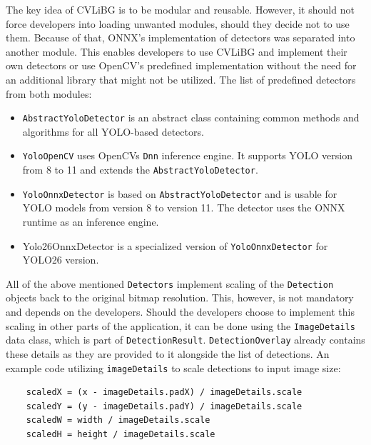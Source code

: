 The key idea of CVLiBG is to be modular and reusable. However, it should not force developers into loading unwanted modules, should they decide not to use them. Because of that, ONNX's implementation of detectors was separated into another module. This enables developers to use CVLiBG and implement their own detectors or use OpenCV's predefined implementation without the need for an additional library that might not be utilized. The list of predefined detectors from both modules:

\begin{itemize}
  \item {\texttt{AbstractYoloDetector} is an abstract class containing common methods and algorithms for all YOLO-based detectors.}
  \item{\texttt{YoloOpenCV} uses OpenCVs \texttt{Dnn} inference engine. It supports YOLO version from 8 to 11 and extends the \texttt{AbstractYoloDetector}.}
  \item {\texttt{YoloOnnxDetector} is based on \texttt{AbstractYoloDetector} and is usable for YOLO models from version 8 to version 11. The detector uses the ONNX runtime as an inference engine.}
  \item {Yolo26OnnxDetector is a specialized version of \texttt{YoloOnnxDetector} for YOLO26 version.}
\end{itemize}
\bigskip

All of the above mentioned \texttt{Detectors} implement scaling of the \texttt{Detection} objects back to the original bitmap resolution. This, however, is not mandatory and depends on the developers. Should the developers choose to implement this scaling in other parts of the application, it can be done using the \texttt{ImageDetails} data class, which is part of \texttt{DetectionResult}. \texttt{DetectionOverlay} already contains these details as they are provided to it alongside the list of detections. An example code utilizing \texttt{imageDetails} to scale detections to input image size:

\begin{verbatim}
    scaledX = (x - imageDetails.padX) / imageDetails.scale
    scaledY = (y - imageDetails.padY) / imageDetails.scale
    scaledW = width / imageDetails.scale
    scaledH = height / imageDetails.scale
\end{verbatim}




